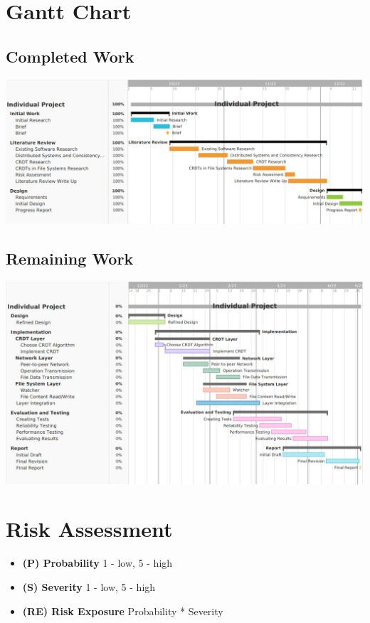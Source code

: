 \documentclass[12pt]{report}
\begin{document}
\section{Gantt Chart}

\subsection{Completed Work}
\includegraphics[width=16cm]{completed.jpg}


\subsection{Remaining Work}
\begin{center}
    \includegraphics[width=16cm]{remaining.jpg}
\end{center}


\section{Risk Assessment}

\begin{itemize}
    \item \textbf{(P) Probability} 1 - low, 5 - high
    \item \textbf{(S) Severity}  1 - low, 5 - high
    \item \textbf{(RE) Risk Exposure} Probability * Severity
\end{itemize}
\end{document}
